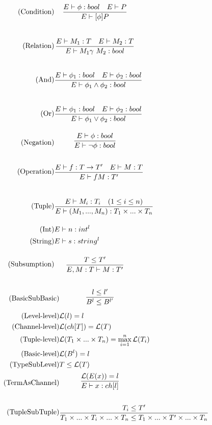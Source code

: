 \begin{align}
\tag{Condition} &\infrule{E\vdash \phi:bool\quad E\vdash P}{E \vdash [\phi] P}\\
\tag{Relation} &\infrule{E\vdash M_1:T \quad E\vdash M_2:T}{E\vdash M_1 \gamma\ M_2:bool}\\
\tag{And} &\infrule{E\vdash \phi _1:bool \quad E\vdash \phi _2:bool}{E\vdash \phi _1 \land \phi _2:bool}\\
\tag{Or} &\infrule{E\vdash \phi _1:bool \quad E\vdash \phi _2:bool}{E\vdash \phi _1 \lor \phi _2:bool}\\
\tag{Negation} &\infrule{E\vdash \phi :bool }{E\vdash \neg \phi :bool}\\
\tag{Operation} &\infrule{E\vdash f:T\ra T'\quad E\vdash M:T}{E\vdash fM:T'}\\
\tag{Tuple} &\infrule{E\vdash M_i:T_i \quad (1\leq i\leq n)}{E\vdash (M_1,...,M_n):T_1\times...\times T_n}\\
\tag{Int} &E\vdash n: int^l\\
\tag{String} &E\vdash s:string^l\\
\tag{Subsumption} &\infrule{T\leq T'}{E, M:T\vdash M:T'}
\end{align}

\begin{align}
\tag{BasicSubBasic} &\infrule{l\leq l'}{B^l\leq B^{l'}}\\
\tag{Level-level} &\level{l}=l\\
\tag{Channel-level} &\level{ch[T]} = \level{T}\\
\tag{Tuple-level} &\level{T_1\times...\times T_n}=\max_{i=1}^{n}{\level{T_i}}\\
\tag{Basic-level} &\level{B^l}=l\\
\tag{TypeSubLevel} &T\leq \level{T}\\
\tag{TermAsChannel} &\infrule{\level{E(x)}=l}{E\vdash x:ch[l]}\\
\tag{TupleSubTuple} &\infrule{T_i\leq T'}{T_1\times...\times T_i\times...\times T_n\leq T_1\times...\times T'\times...\times T_n}
\end{align}

